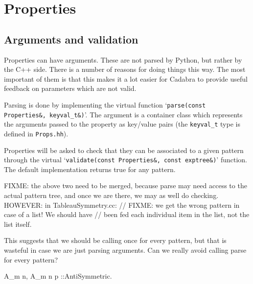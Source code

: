 
\section{Properties}

\subsection{Arguments and validation}

Properties can have arguments. These are not parsed by Python, but
rather by the C++ side. There is a number of reasons for doing things
this way. The most important of them is that this makes it a lot
easier for Cadabra to provide useful feedback on parameters which are
not valid.

Parsing is done by implementing the virtual function
`\verb|parse(const Properties&, keyval_t&)|'. The argument is a
container class which represents the arguments passed to the property
as key/value pairs (the \verb|keyval_t| type is defined in
\verb|Props.hh|).

Properties will be asked to check that they can be associated to a
given pattern through the virtual
`\verb|validate(const Properties&, const exptree&)|' function. The
default implementation returns true for any pattern.

FIXME: the above two need to be merged, because parse may need access
to the actual pattern tree, and once we are there, we may as well
do checking.
HOWEVER: in TableauSymmetry.cc:
			 // FIXME: we get the wrong pattern in case of a list! We should have
			 // been fed each individual item in the list, not the list itself.


This suggests that we should be calling once for every pattern, but 
that is wasteful in case we are just parsing arguments. Can we really
avoid calling parse for every pattern?

{ A_{m n}, A_{m n p} }::AntiSymmetric.
